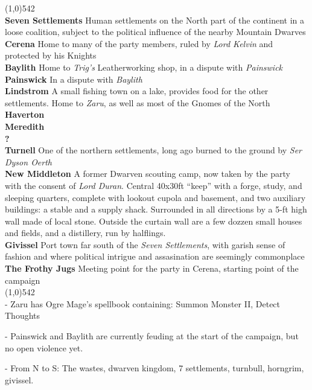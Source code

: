 \documentclass[letterpaper]{article}
\newcommand{\fullline}{\noindent\line(1,0){542} \\}
\begin{document}
\vspace{-1.75em}
\fullline
\textbf{Seven Settlements} Human settlements on the North part of the continent in a loose coalition, subject to the political influence of the nearby Mountain Dwarves \\
\indent\textbf{Cerena} Home to many of the party members, ruled by \emph{Lord Kelvin} and protected by his Knights \\
\indent\textbf{Baylith} Home to \emph{Trig's} Leatherworking shop, in a dispute with \emph{Painswick} \\
\indent\textbf{Painswick} In a dispute with \emph{Baylith} \\
\indent\textbf{Lindstrom} A small fishing town on a lake, provides food for the other settlements.  Home to \emph{Zaru}, as well as most of the Gnomes of the North \\
\indent\textbf{Haverton} \\
\indent\textbf{Meredith} \\
\indent\textbf{?} \\
\textbf{Turnell} One of the northern settlements, long ago burned to the ground by \emph{Ser Dyson Oerth} \\
\textbf{New Middleton} A former Dwarven scouting camp, now taken by the party with the consent of \emph{Lord Duran}.  Central 40x30ft ``keep'' with a forge, study, and sleeping quarters, complete with lookout cupola and basement, and two auxiliary buildings: a stable and a supply shack. Surrounded in all directions by a 5-ft high wall made of local stone. Outside the curtain wall are a few dozzen small houses and fields, and a distillery, run by halflings. \\
\textbf{Givissel} Port town far south of the \emph{Seven Settlements}, with garish sense of fashion and where political intrigue and assasination are seemingly commonplace \\
\textbf{The Frothy Jugs} Meeting point for the party in Cerena, starting point of the campaign\\

\vspace{-1.75em}
\fullline
\noindent - Zaru has Ogre Mage's spellbook containing: Summon Monster II, Detect Thoughts

\noindent - Painswick and Baylith are currently feuding at the start of the campaign, but no open violence yet.

\noindent - From N to S: The wastes, dwarven kingdom, 7 settlements, turnbull, horngrim, givissel.
\end{document}
